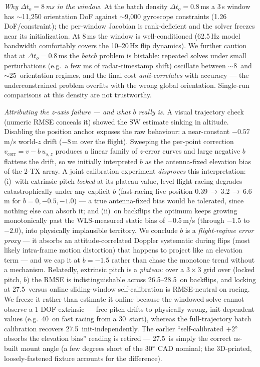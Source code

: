 \documentclass[journal]{IEEEtran}
\begin{document}
\emph{Why $\Delta t_o{=}8$\,ms in the window.}
At the batch density $\Delta t_o{=}0.8$\,ms a 3\,s window has
$\sim$11{,}250 orientation DoF against $\sim$9{,}000 gyroscope
constraints (1.26 DoF/constraint); the per-window Jacobian is
rank-deficient and the solver freezes near its initialization.
At 8\,ms the window is well-conditioned (62.5\,Hz model bandwidth
comfortably covers the 10--20\,Hz flip dynamics).
We further caution that at $\Delta t_o{=}0.8$\,ms the \emph{batch}
problem is bistable: repeated solves under small perturbations
(e.g.\ a few ms of radar-timestamp shift) oscillate between
$\sim$8\degree\ and $\sim$25\degree\ orientation regimes, and the
final cost \emph{anti-correlates} with accuracy --- the
underconstrained problem overfits with the wrong global orientation.
Single-run comparisons at this density are not trustworthy.

\emph{Attributing the z-axis failure --- and what $b$ really is.}
A visual trajectory check (numeric RMSE conceals it) showed the SW
estimate sinking in altitude.  Disabling the position anchor exposes
the raw behaviour: a near-constant $-0.57$\,m/s world-$z$ drift
($-8$\,m over the flight).  Sweeping the per-point correction
$v_{\mathrm{corr}} = v - b\,u_{s,z}$ produces a linear family of
$z$-error curves and large negative $b$ flattens the drift, so we
initially interpreted $b$ as the antenna-fixed elevation bias of the
2-TX array.  A joint calibration experiment \emph{disproves} this
interpretation: (i)~with extrinsic pitch \emph{locked} at its
plateau value, level-flight racing degrades catastrophically under
any explicit $b$ (fast-racing live position
0.39\,$\to$\,3.2\,$\to$\,6.6\,m for $b{=}0,-0.5,-1.0$) --- a true
antenna-fixed bias would be tolerated, since nothing else can absorb
it; and (ii)~on backflips the optimum keeps growing monotonically
past the WLS-measured static bias of $-0.5$\,m/s (through $-1.5$
to $-2.0$), into physically implausible territory.
We conclude $b$ is a \emph{flight-regime error proxy} --- it absorbs
an attitude-correlated Doppler systematic during flips (most likely
intra-frame motion distortion) that happens to project like an
elevation term --- and we cap it at $b{=}{-}1.5$ rather than chase
the monotone trend without a mechanism.
Relatedly, extrinsic pitch is a \emph{plateau}: over a $3{\times}3$ grid
over (locked pitch, $b$) the RMSE is indistinguishable across
26.5--28.5\degree\ on backflips, and locking at 27.5\degree\ versus
online sliding-window self-calibration is RMSE-neutral on racing.  We
freeze it rather than estimate it online because the windowed solve
cannot observe a 1-DOF extrinsic --- free pitch drifts to physically
wrong, init-dependent values (e.g.\ 40\degree\ on fast racing from a
30\degree\ start), whereas the full-trajectory batch calibration
recovers 27.5\degree\ init-independently.  The earlier
``self-calibrated $+2\degree$ absorbs the elevation bias'' reading is
retired --- 27.5\degree\ is simply the correct as-built mount angle (a
few degrees short of the $30\degree$ CAD nominal; the 3D-printed,
loosely-fastened fixture accounts for the difference).
\end{document}
